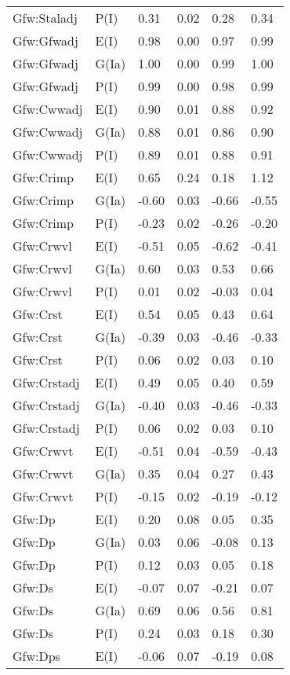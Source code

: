 \begin{center}
\begin{longtable}{|p{1.1in}|p{0.7in}|p{0.7in}|p{0.6in}|p{0.6in}|p{0.6in}|}
  Gfw:Staladj & P(I) & 0.31 & 0.02 & 0.28 & 0.34 \\ 
  Gfw:Gfwadj & E(I) & 0.98 & 0.00 & 0.97 & 0.99 \\ 
  Gfw:Gfwadj & G(Ia) & 1.00 & 0.00 & 0.99 & 1.00 \\ 
  Gfw:Gfwadj & P(I) & 0.99 & 0.00 & 0.98 & 0.99 \\ 
  Gfw:Cwwadj & E(I) & 0.90 & 0.01 & 0.88 & 0.92 \\ 
  Gfw:Cwwadj & G(Ia) & 0.88 & 0.01 & 0.86 & 0.90 \\ 
  Gfw:Cwwadj & P(I) & 0.89 & 0.01 & 0.88 & 0.91 \\ 
  Gfw:Crimp & E(I) & 0.65 & 0.24 & 0.18 & 1.12 \\ 
  Gfw:Crimp & G(Ia) & -0.60 & 0.03 & -0.66 & -0.55 \\ 
  Gfw:Crimp & P(I) & -0.23 & 0.02 & -0.26 & -0.20 \\ 
  Gfw:Crwvl & E(I) & -0.51 & 0.05 & -0.62 & -0.41 \\ 
  Gfw:Crwvl & G(Ia) & 0.60 & 0.03 & 0.53 & 0.66 \\ 
  Gfw:Crwvl & P(I) & 0.01 & 0.02 & -0.03 & 0.04 \\ 
  Gfw:Crst & E(I) & 0.54 & 0.05 & 0.43 & 0.64 \\ 
  Gfw:Crst & G(Ia) & -0.39 & 0.03 & -0.46 & -0.33 \\ 
  Gfw:Crst & P(I) & 0.06 & 0.02 & 0.03 & 0.10 \\ 
  Gfw:Crstadj & E(I) & 0.49 & 0.05 & 0.40 & 0.59 \\ 
  Gfw:Crstadj & G(Ia) & -0.40 & 0.03 & -0.46 & -0.33 \\ 
  Gfw:Crstadj & P(I) & 0.06 & 0.02 & 0.03 & 0.10 \\ 
  Gfw:Crwvt & E(I) & -0.51 & 0.04 & -0.59 & -0.43 \\ 
  Gfw:Crwvt & G(Ia) & 0.35 & 0.04 & 0.27 & 0.43 \\ 
  Gfw:Crwvt & P(I) & -0.15 & 0.02 & -0.19 & -0.12 \\ 
  Gfw:Dp & E(I) & 0.20 & 0.08 & 0.05 & 0.35 \\ 
  Gfw:Dp & G(Ia) & 0.03 & 0.06 & -0.08 & 0.13 \\ 
  Gfw:Dp & P(I) & 0.12 & 0.03 & 0.05 & 0.18 \\ 
  Gfw:Ds & E(I) & -0.07 & 0.07 & -0.21 & 0.07 \\ 
  Gfw:Ds & G(Ia) & 0.69 & 0.06 & 0.56 & 0.81 \\ 
  Gfw:Ds & P(I) & 0.24 & 0.03 & 0.18 & 0.30 \\ 
  Gfw:Dps & E(I) & -0.06 & 0.07 & -0.19 & 0.08 \\ 

\end{longtable}
\end{center}

